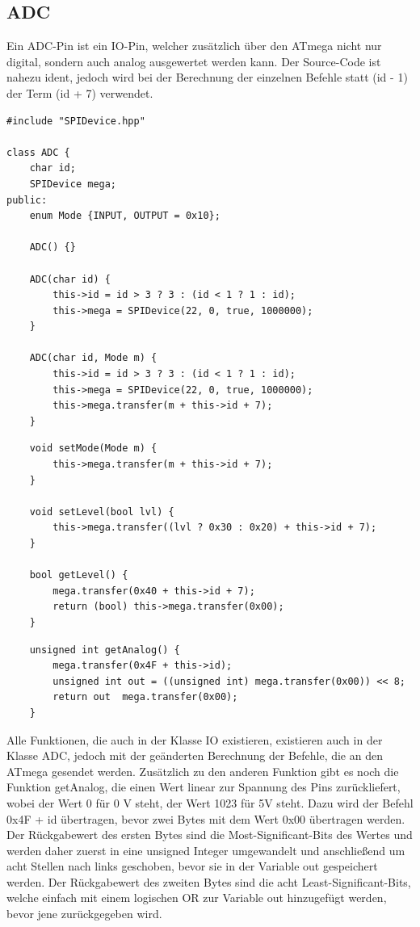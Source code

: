 \documentclass[12pt]{article}
\begin{document}
\subsection{ADC}
Ein ADC-Pin ist ein IO-Pin, welcher zusätzlich über den ATmega nicht nur digital, sondern auch analog ausgewertet werden kann. Der Source-Code ist nahezu ident, jedoch wird bei der Berechnung der einzelnen Befehle statt (id - 1) der Term (id + 7) verwendet.\\
\begin{verbatim}
#include "SPIDevice.hpp"

class ADC {
    char id;
    SPIDevice mega;
public:
    enum Mode {INPUT, OUTPUT = 0x10};

    ADC() {}

    ADC(char id) {
        this->id = id > 3 ? 3 : (id < 1 ? 1 : id);
        this->mega = SPIDevice(22, 0, true, 1000000);
    }

    ADC(char id, Mode m) {
        this->id = id > 3 ? 3 : (id < 1 ? 1 : id);
        this->mega = SPIDevice(22, 0, true, 1000000);
        this->mega.transfer(m + this->id + 7);
    }
\end{verbatim}
\begin{verbatim}
    void setMode(Mode m) {
        this->mega.transfer(m + this->id + 7);
    }

    void setLevel(bool lvl) {
        this->mega.transfer((lvl ? 0x30 : 0x20) + this->id + 7);
    }

    bool getLevel() {
        mega.transfer(0x40 + this->id + 7);
        return (bool) this->mega.transfer(0x00);
    }
\end{verbatim}
\begin{verbatim}
    unsigned int getAnalog() {
        mega.transfer(0x4F + this->id);
        unsigned int out = ((unsigned int) mega.transfer(0x00)) << 8;
        return out  mega.transfer(0x00);
    }
\end{verbatim}
Alle Funktionen, die auch in der Klasse IO existieren, existieren auch in der Klasse ADC, jedoch mit der geänderten Berechnung der Befehle, die an den ATmega gesendet werden. Zusätzlich zu den anderen Funktion gibt es noch die Funktion getAnalog, die einen Wert linear zur Spannung des Pins zurückliefert, wobei der Wert 0 für 0 V steht, der Wert 1023 für 5V steht. Dazu wird der Befehl 0x4F + id übertragen, bevor zwei Bytes mit dem Wert 0x00 übertragen werden. Der Rückgabewert des ersten Bytes sind die Most-Significant-Bits des Wertes und werden daher zuerst in eine unsigned Integer umgewandelt und anschließend um acht Stellen nach links geschoben, bevor sie in der Variable out gespeichert werden. Der Rückgabewert des zweiten Bytes sind die acht Least-Significant-Bits, welche einfach mit einem logischen OR zur Variable out hinzugefügt werden, bevor jene zurückgegeben wird.
\end{document}
